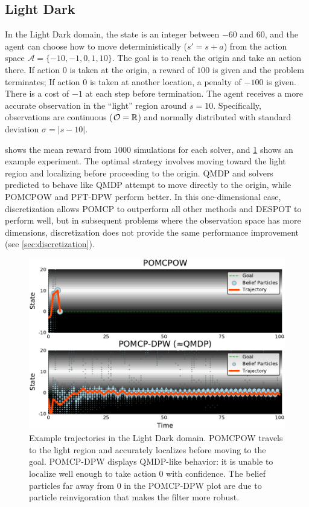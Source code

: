 \subsection{Light Dark}

In the Light Dark domain, the state is an integer between $-60$ and $60$, and the agent can choose how to move deterministically ($s' = s+a$) from the action space $\mathcal{A}=\{-10, -1, 0, 1, 10\}$. 
The goal is to reach the origin and take an action there.
If action $0$ is taken at the origin, a reward of $100$ is given and the problem terminates; If action $0$ is taken at another location, a penalty of $-100$ is given.
There is a cost of $-1$ at each step before termination.
The agent receives a more accurate observation in the ``light'' region around $s=10$.
Specifically, observations are continuous ($\mathcal{O}=\mathbb{R}$) and normally distributed with standard deviation $\sigma=|s-10|$.

 shows the mean reward from $1000$ simulations for each solver, and \cref{fig:ld} shows an example experiment.
The optimal strategy involves moving toward the light region and localizing before proceeding to the origin. 
QMDP and solvers predicted to behave like QMDP attempt to move directly to the origin, while POMCPOW and PFT-DPW perform better.
In this one-dimensional case, discretization allows POMCP to outperform all other methods and DESPOT to perform well, but in subsequent problems where the observation space has more dimensions, discretization does not provide the same performance improvement (see \cref{sec:discretization}).

\begin{figure}[htb]
    \centering
    \includegraphics[width=0.6\columnwidth]{media/ld_fig.pdf}
    \caption[Light Dark problem]{Example trajectories in the Light Dark domain. POMCPOW travels to the light region and accurately localizes before moving to the goal. POMCP-DPW displays QMDP-like behavior: it is unable to localize well enough to take action \num{0} with confidence. The belief particles far away from \num{0} in the POMCP-DPW plot are due to particle reinvigoration that makes the filter more robust.}
    \label{fig:ld}
\end{figure}

